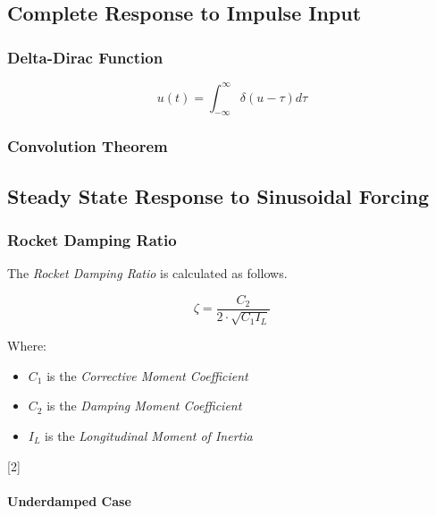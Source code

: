\documentclass[]{article}
\providecommand{\tightlist}{%
  \setlength{\itemsep}{0pt}\setlength{\parskip}{0pt}}
\let\oldparagraph\paragraph
\renewcommand{\paragraph}[1]{\oldparagraph{#1}\mbox{}}
\begin{document}
\subsection{Complete Response to Impulse
Input}\label{complete-response-to-impulse-input}

\subsubsection{Delta-Dirac Function}\label{delta-dirac-function}

\begin{equation}
\label{eq_delta_dirac}
u(t) = \int_{-\infty}^{\infty} \delta ( u - \tau ) d \tau
\end{equation}

\subsubsection{Convolution Theorem}\label{convolution-theorem}

\subsection{Steady State Response to Sinusoidal
Forcing}\label{steady-state-response-to-sinusoidal-forcing}

\subsubsection{Rocket Damping Ratio}\label{rocket-damping-ratio}

The \emph{Rocket Damping Ratio} is calculated as follows.

\begin{equation}
\label{eq_rocket_damping_ratio}
\zeta = \dfrac{C_2}{2 \cdot \sqrt{C_1 I_L}}
\end{equation}

Where:

\begin{itemize}
\tightlist
\item
  \(C_1\) is the \emph{Corrective Moment Coefficient}
\item
  \(C_2\) is the \emph{Damping Moment Coefficient}
\item
  \(I_L\) is the \emph{Longitudinal Moment of Inertia}
\end{itemize}

{[}2{]}

\paragraph{Underdamped Case}\label{underdamped-case}
\end{document}
